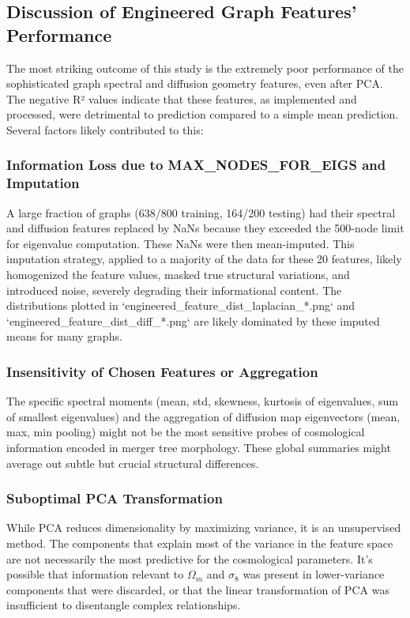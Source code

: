 \documentclass[twocolumn]{aastex631}
\begin{document}
\subsection{Discussion of Engineered Graph Features' Performance}

The most striking outcome of this study is the extremely poor performance of the sophisticated graph spectral and diffusion geometry features, even after PCA. The negative R² values indicate that these features, as implemented and processed, were detrimental to prediction compared to a simple mean prediction. Several factors likely contributed to this:

\subsubsection{Information Loss due to MAX\_NODES\_FOR\_EIGS and Imputation}
A large fraction of graphs (638/800 training, 164/200 testing) had their spectral and diffusion features replaced by NaNs because they exceeded the 500-node limit for eigenvalue computation. These NaNs were then mean-imputed. This imputation strategy, applied to a majority of the data for these 20 features, likely homogenized the feature values, masked true structural variations, and introduced noise, severely degrading their informational content. The distributions plotted in `engineered_feature_dist_laplacian_*.png` and `engineered_feature_dist_diff_*.png` are likely dominated by these imputed means for many graphs.

\subsubsection{Insensitivity of Chosen Features or Aggregation}
The specific spectral moments (mean, std, skewness, kurtosis of eigenvalues, sum of smallest eigenvalues) and the aggregation of diffusion map eigenvectors (mean, max, min pooling) might not be the most sensitive probes of cosmological information encoded in merger tree morphology. These global summaries might average out subtle but crucial structural differences.

\subsubsection{Suboptimal PCA Transformation}
While PCA reduces dimensionality by maximizing variance, it is an unsupervised method. The components that explain most of the variance in the feature space are not necessarily the most predictive for the cosmological parameters. It's possible that information relevant to $\Omega_m$ and $\sigma_8$ was present in lower-variance components that were discarded, or that the linear transformation of PCA was insufficient to disentangle complex relationships.
\end{document}
